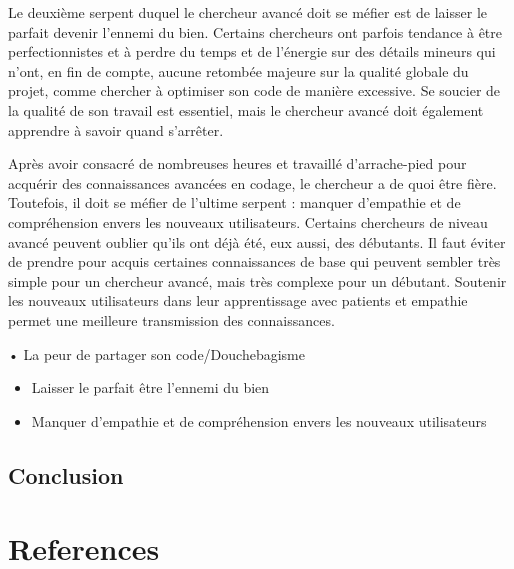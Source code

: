 \documentclass[
  letterpaper,
]{scrbook}
\begin{document}
Le deuxième serpent duquel le chercheur avancé doit se méfier est de
laisser le parfait devenir l'ennemi du bien. Certains chercheurs ont
parfois tendance à être perfectionnistes et à perdre du temps et de
l'énergie sur des détails mineurs qui n'ont, en fin de compte, aucune
retombée majeure sur la qualité globale du projet, comme chercher à
optimiser son code de manière excessive. Se soucier de la qualité de son
travail est essentiel, mais le chercheur avancé doit également apprendre
à savoir quand s'arrêter.

Après avoir consacré de nombreuses heures et travaillé d'arrache-pied
pour acquérir des connaissances avancées en codage, le chercheur a de
quoi être fière. Toutefois, il doit se méfier de l'ultime serpent :
manquer d'empathie et de compréhension envers les nouveaux utilisateurs.
Certains chercheurs de niveau avancé peuvent oublier qu'ils ont déjà
été, eux aussi, des débutants. Il faut éviter de prendre pour acquis
certaines connaissances de base qui peuvent sembler très simple pour un
chercheur avancé, mais très complexe pour un débutant. Soutenir les
nouveaux utilisateurs dans leur apprentissage avec patients et empathie
permet une meilleure transmission des connaissances.

• La peur de partager son code/Douchebagisme

\begin{itemize}
\item
  Laisser le parfait être l'ennemi du bien
\item
  Manquer d'empathie et de compréhension envers les nouveaux
  utilisateurs
\end{itemize}

\hypertarget{conclusion-4}{%
\section{Conclusion}\label{conclusion-4}}


\hypertarget{references}{%
\chapter*{References}\label{references}}

\end{document}
